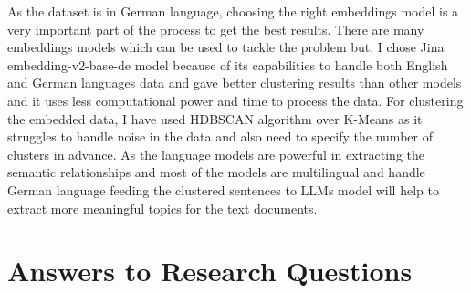 As the dataset is in German language, choosing the right embeddings model is a very important part of the process to get the best results.
There are many embeddings models which can be used to tackle the problem but, I chose Jina embedding-v2-base-de model because of its 
capabilities to handle both English and German languages data and gave better clustering results than other models and it 
uses less computational power and time to process the data. For clustering the embedded data, I have used HDBSCAN algorithm over K-Means
as it struggles to handle noise in the data and also need to specify the number of clusters in advance.
As the language models are powerful in extracting the semantic relationships and most of the models are multilingual and handle German
language feeding the clustered sentences to LLMs model will help to extract more meaningful topics for the text documents.

\section{Answers to Research Questions}

